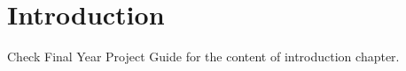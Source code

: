 
\chapter{Introduction}

Check Final Year Project Guide for the content of introduction chapter.

\clearpage %
